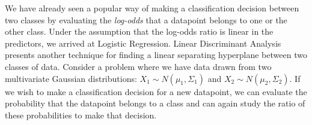 \documentclass{article}
\begin{document}




 We have already seen a popular way of making a classification decision between two classes by evaluating the \textit{log-odds} that a datapoint belongs to one or the other class. Under the assumption that the log-odds ratio is linear in the predictors, we arrived at Logistic Regression. Linear Discriminant Analysis presents another technique for finding a linear separating hyperplane between two classes of data. Consider a problem where we have data drawn from two multivariate Gaussian distributions: $X_1 \sim N(\mu_1, \Sigma_1)$ and $X_2 \sim N(\mu_2, \Sigma_2)$. If we wish to make a classification decision for a new datapoint, we can evaluate the probability that the datapoint belongs to a class and can again study the ratio of these probabilities to make that decision.
\end{document}
